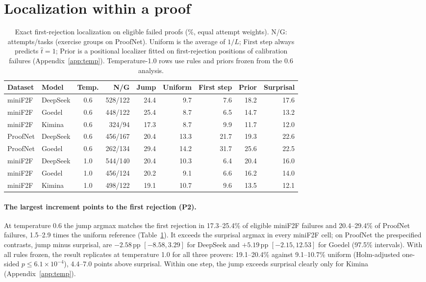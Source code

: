 \section{Localization within a proof}\label{sec:loc}

\begin{table}[t]
\caption{Exact first-rejection localization on eligible failed proofs (\%, equal attempt weights). N/G: attempts/tasks (exercise groups on ProofNet). Uniform is the average of $1/L$; First step always predicts $\hat t=1$; Prior is a positional localizer fitted on first-rejection positions of calibration failures (Appendix~\ref{app:temp}). Temperature-1.0 rows use rules and priors frozen from the 0.6 analysis.}
\label{tab:main}
\begin{center}
\small
\setlength{\tabcolsep}{4pt}
\begin{tabular}{llcrrrrrr}
\toprule
Dataset & Model & Temp. & N/G & Jump & Uniform & First step & Prior & Surprisal\\
\midrule
miniF2F & DeepSeek & 0.6 & 528/122 & 24.4 & 9.7 & 7.6 & 18.2 & 17.6\\
miniF2F & Goedel & 0.6 & 448/122 & 25.4 & 8.7 & 6.5 & 14.7 & 13.2\\
miniF2F & Kimina & 0.6 & 324/94 & 17.3 & 8.7 & 9.9 & 11.7 & 12.0\\
ProofNet & DeepSeek & 0.6 & 456/167 & 20.4 & 13.3 & 21.7 & 19.3 & 22.6\\
ProofNet & Goedel & 0.6 & 262/134 & 29.4 & 14.2 & 31.7 & 25.6 & 22.5\\
\midrule
miniF2F & DeepSeek & 1.0 & 544/140 & 20.4 & 10.3 & 6.4 & 20.4 & 16.0\\
miniF2F & Goedel & 1.0 & 456/124 & 20.2 & 9.1 & 6.6 & 16.2 & 14.0\\
miniF2F & Kimina & 1.0 & 498/122 & 19.1 & 10.7 & 9.6 & 13.5 & 12.1\\
\bottomrule
\end{tabular}
\end{center}
\end{table}

\paragraph{The largest increment points to the first rejection (P2).} At temperature 0.6 the jump argmax matches the first rejection in 17.3--25.4\% of eligible miniF2F failures and 20.4--29.4\% of ProofNet failures, 1.5--2.9 times the uniform reference (Table~\ref{tab:main}). It exceeds the surprisal argmax in every miniF2F cell; on ProofNet the prespecified contrasts, jump minus surprisal, are $-2.58$\,pp $[-8.58, 3.29]$ for DeepSeek and $+5.19$\,pp $[-2.15, 12.53]$ for Goedel (97.5\% intervals). With all rules frozen, the result replicates at temperature 1.0 for all three provers: 19.1--20.4\% against 9.1--10.7\% uniform (Holm-adjusted one-sided $p\le6.1\times10^{-4}$), 4.4--7.0 points above surprisal. Within one step, the jump exceeds surprisal clearly only for Kimina (Appendix~\ref{app:temp}).

